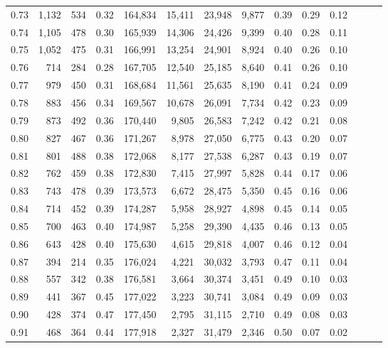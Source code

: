 \begin{tabular}{rrrrrrrrrrrrrr}
0.73 &  1,132 &  534 &  0.32 &  164,834 &   15,411 &  23,948 &   9,877 &  0.39 &  0.29 &      0.12 \\
0.74 &  1,105 &  478 &  0.30 &  165,939 &   14,306 &  24,426 &   9,399 &  0.40 &  0.28 &      0.11 \\
0.75 &  1,052 &  475 &  0.31 &  166,991 &   13,254 &  24,901 &   8,924 &  0.40 &  0.26 &      0.10 \\
0.76 &    714 &  284 &  0.28 &  167,705 &   12,540 &  25,185 &   8,640 &  0.41 &  0.26 &      0.10 \\
0.77 &    979 &  450 &  0.31 &  168,684 &   11,561 &  25,635 &   8,190 &  0.41 &  0.24 &      0.09 \\
0.78 &    883 &  456 &  0.34 &  169,567 &   10,678 &  26,091 &   7,734 &  0.42 &  0.23 &      0.09 \\
0.79 &    873 &  492 &  0.36 &  170,440 &    9,805 &  26,583 &   7,242 &  0.42 &  0.21 &      0.08 \\
0.80 &    827 &  467 &  0.36 &  171,267 &    8,978 &  27,050 &   6,775 &  0.43 &  0.20 &      0.07 \\
0.81 &    801 &  488 &  0.38 &  172,068 &    8,177 &  27,538 &   6,287 &  0.43 &  0.19 &      0.07 \\
0.82 &    762 &  459 &  0.38 &  172,830 &    7,415 &  27,997 &   5,828 &  0.44 &  0.17 &      0.06 \\
0.83 &    743 &  478 &  0.39 &  173,573 &    6,672 &  28,475 &   5,350 &  0.45 &  0.16 &      0.06 \\
0.84 &    714 &  452 &  0.39 &  174,287 &    5,958 &  28,927 &   4,898 &  0.45 &  0.14 &      0.05 \\
0.85 &    700 &  463 &  0.40 &  174,987 &    5,258 &  29,390 &   4,435 &  0.46 &  0.13 &      0.05 \\
0.86 &    643 &  428 &  0.40 &  175,630 &    4,615 &  29,818 &   4,007 &  0.46 &  0.12 &      0.04 \\
0.87 &    394 &  214 &  0.35 &  176,024 &    4,221 &  30,032 &   3,793 &  0.47 &  0.11 &      0.04 \\
0.88 &    557 &  342 &  0.38 &  176,581 &    3,664 &  30,374 &   3,451 &  0.49 &  0.10 &      0.03 \\
0.89 &    441 &  367 &  0.45 &  177,022 &    3,223 &  30,741 &   3,084 &  0.49 &  0.09 &      0.03 \\
0.90 &    428 &  374 &  0.47 &  177,450 &    2,795 &  31,115 &   2,710 &  0.49 &  0.08 &      0.03 \\
0.91 &    468 &  364 &  0.44 &  177,918 &    2,327 &  31,479 &   2,346 &  0.50 &  0.07 &      0.02 \\

\end{tabular}
